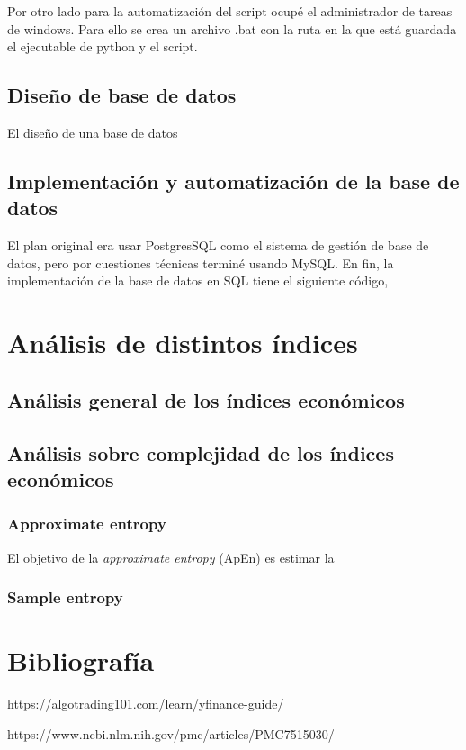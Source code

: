 \documentclass[10pt,a4paper]{article}
\begin{document}
	Por otro lado para la automatización del script ocupé el administrador de tareas de windows. Para ello se crea un archivo .bat con la ruta en la que está guardada el ejecutable de python y el script. 
	
		\subsection{Diseño de base de datos}
		
	El diseño de una base de datos
		
		\subsection{Implementación y automatización de la base de datos}
	
	El plan original era usar PostgresSQL como el sistema de gestión de base de datos, pero por cuestiones técnicas terminé usando MySQL. En fin, la implementación de la base de datos en SQL tiene el siguiente código, 
	
	
		
	
	
	
\section{Análisis de distintos índices}
	
	\subsection{Análisis general de los índices económicos}	
	
	
	\subsection{Análisis sobre complejidad de los índices económicos}
	
	\subsubsection{Approximate entropy}
	
	El objetivo de la \textit{approximate entropy} (ApEn) es estimar la 
	
	\subsubsection{Sample entropy}
		
\section{Bibliografía}

	https://algotrading101.com/learn/yfinance-guide/
	
	https://www.ncbi.nlm.nih.gov/pmc/articles/PMC7515030/
	
\end{document}

